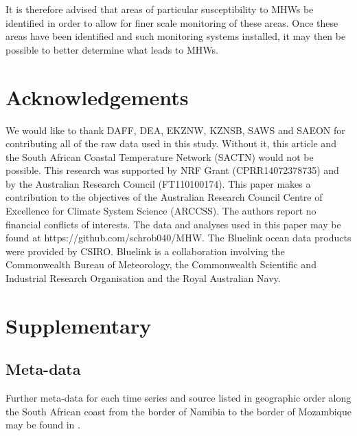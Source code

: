 \documentclass[a4paper,10pt,review]{elsarticle}
\begin{document}
It is therefore advised that areas of particular susceptibility to MHWs be identified in order to allow for finer scale monitoring of these areas. Once these areas have been identified and such monitoring systems installed, it may then be possible to better determine what leads to MHWs. 

\section*{Acknowledgements}
We would like to thank DAFF, DEA, EKZNW, KZNSB, SAWS and SAEON for contributing all of the raw data used in this study. Without it, this article and the South African Coastal Temperature Network (SACTN) would not be possible. This research was supported by NRF Grant (CPRR14072378735) and by the Australian Research Council (FT110100174). This paper makes a contribution to the objectives of the Australian Research Council Centre of Excellence for Climate System Science (ARCCSS). The authors report no financial conflicts of interests. The data and analyses used in this paper may be found at https://github.com/schrob040/MHW. The Bluelink ocean data products were provided by CSIRO. Bluelink is a collaboration involving the Commonwealth Bureau of Meteorology, the Commonwealth Scientific and Industrial Research Organisation and the Royal Australian Navy.

\section*{Supplementary}
\subsection*{Meta-data}
Further meta-data for each time series and source listed in geographic order along the South African coast from the border of Namibia to the border of Mozambique may be found in .
\end{document}
